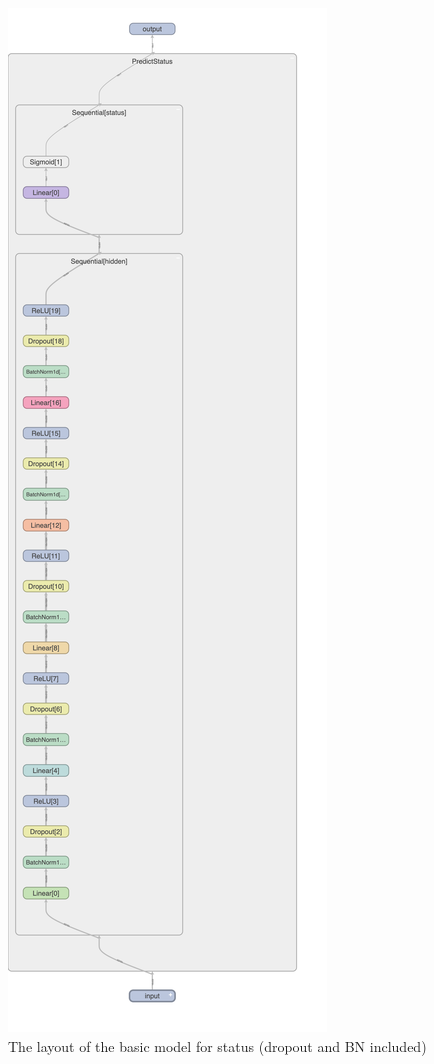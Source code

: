\documentclass[12pt,twoside]{report}
\begin{document}
\begin{figure}[H]
	\centering
	\includegraphics[height=\textheight]{basic_status_final_layout}
	\caption{The layout of the basic model for status (dropout and BN included)}
	\label{basic_status_final_layout}
\end{figure}
\end{document}
